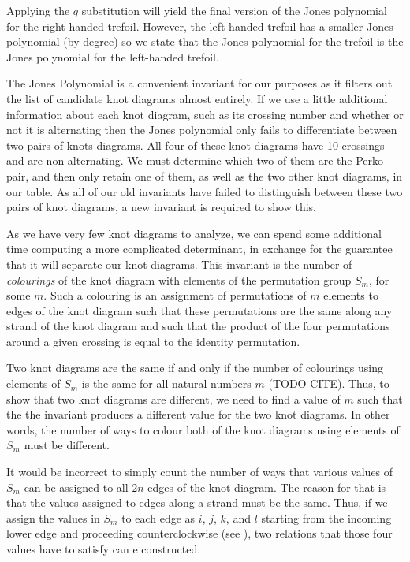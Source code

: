 \begin{paper}
Applying the $q$ substitution will yield the final version of the Jones
polynomial for the right-handed trefoil.
However, the left-handed trefoil has a smaller Jones polynomial (by degree) so
we state that the Jones polynomial for the trefoil is the Jones polynomial for
the left-handed trefoil.




The Jones Polynomial is a convenient invariant for our purposes as it filters
out the list of candidate knot diagrams almost entirely.
If we use a little additional information about each knot diagram, such as its
crossing number and whether or not it is alternating then the Jones polynomial
only fails to differentiate between two pairs of knots diagrams.
All four of these knot diagrams have 10 crossings and are non-alternating.
We must determine which two of them are the Perko pair, and then only retain one
of them, as well as the two other knot diagrams, in our table.
As all of our old invariants have failed to distinguish between these two pairs
of knot diagrams, a new invariant is required to show this.

As we have very few knot diagrams to analyze, we can spend some additional time
computing a more complicated determinant, in exchange for the guarantee that it
will separate our knot diagrams.
This invariant is the number of \textit{colourings} of the knot diagram with
elements of the permutation group $S_m$, for some $m$.
Such a colouring is an assignment of permutations of $m$ elements to edges of
the knot diagram such that these permutations are the same along any strand of
the knot diagram and such that the product of the four permutations around a
given crossing is equal to the identity permutation.

Two knot diagrams are the same if and only if the number of colourings using
elements of $S_m$ is the same for all natural numbers $m$ (TODO CITE).
Thus, to show that two knot diagrams are different, we need to find a value of
$m$ such that the the invariant produces a different value for the two knot
diagrams.
In other words, the number of ways to colour both of the knot diagrams using
elements of $S_m$ must be different.

It would be incorrect to simply count the number of ways that various values of
$S_m$ can be assigned to all $2n$ edges of the knot diagram.
The reason for that is that the values assigned to edges along a strand must be
the same.
Thus, if we assign the values in $S_m$ to each edge as $i$, $j$, $k$, and $l$
starting from the incoming lower edge and proceeding counterclockwise (see
\figX), two relations that those four values have to satisfy can e constructed.


\end{paper}
